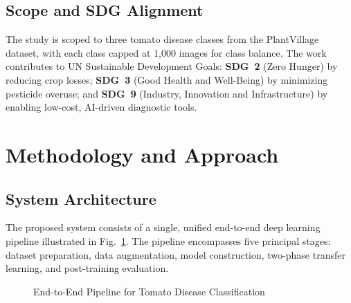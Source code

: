 \documentclass[12pt, a4paper, onecolumn]{IEEEtran}
\begin{document}
\subsection{Scope and SDG Alignment}

The study is scoped to three tomato disease classes from the PlantVillage dataset, with each class
capped at 1,000 images for class balance. The work contributes to UN Sustainable Development Goals:
\textbf{SDG~2} (Zero Hunger) by reducing crop losses; \textbf{SDG~3} (Good Health and Well-Being) by
minimizing pesticide overuse; and \textbf{SDG~9} (Industry, Innovation and Infrastructure) by enabling
low-cost, AI-driven diagnostic tools.

\section{Methodology and Approach}

\subsection{System Architecture}

The proposed system consists of a single, unified end-to-end deep learning pipeline illustrated in
Fig.~\ref{fig:pipeline}. The pipeline encompasses five principal stages: dataset preparation, data
augmentation, model construction, two-phase transfer learning, and post-training evaluation.

\begin{figure}[H]
  \centering
  \caption{End-to-End Pipeline for Tomato Disease Classification}
  \label{fig:pipeline}
\end{figure}
\end{document}
